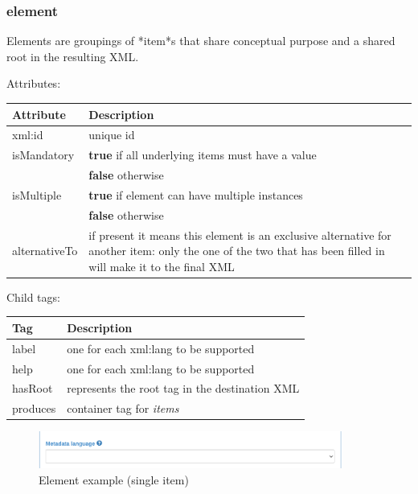 \documentclass[10pt]{article}
\begin{document}
	\subsubsection{element} \label{element}
	Elements are groupings of *item*s that share conceptual purpose and a shared root in the resulting XML.
	
	Attributes:
		\begin{center}
		\begin{tabular}{ | p{} | p{} | }
			\hline
			Attribute & Description \\ 
			\hline
			xml:id & unique id \\
			\hline
			isMandatory & \textbf{true} if all underlying items must have a value \\ & \textbf{false} otherwise \\
			\hline
			isMultiple & \textbf{true} if element can have multiple instances \\ & \textbf{false} otherwise  \\
			\hline
			alternativeTo & if present it means this element is an exclusive alternative for another item: only the one of the two that has been filled in will make it to the final XML \\
			\hline
		\end{tabular}
	\end{center}
	
		Child tags:
	\begin{center}
		\begin{tabular}{ | p{} | p{} | }
			\hline
			Tag & Description \\ 
			\hline
			label & one for each xml:lang to be supported \\
			help & one for each xml:lang to be supported \\
			\hline
			hasRoot & represents the root tag in the destination XML \\
			\hline
			produces & container tag for \textit{items} \\
			\hline
			
		\end{tabular}
	\end{center}
	
	\begin{figure}[h]
		\caption{Element example (single item)}
		\includegraphics[width=10cm]{Element single item.png}
		\centering
	\end{figure}
	
\end{document}
